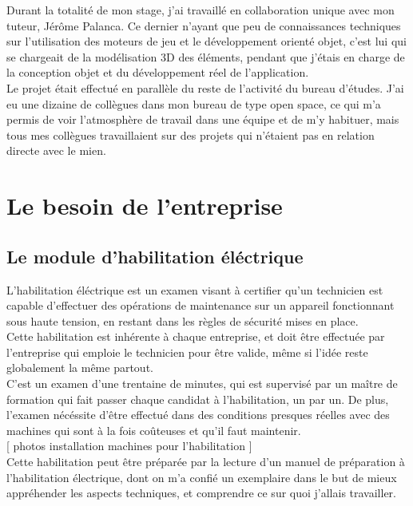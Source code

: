 \documentclass[a4paper]{article}
\begin{document}
    Durant la totalité de mon stage, j'ai travaillé en collaboration unique avec mon tuteur, Jérôme Palanca. Ce dernier n'ayant que peu de connaissances techniques sur l'utilisation des moteurs de jeu et le développement orienté objet, c'est lui qui se chargeait de la modélisation 3D des éléments, pendant que j'étais en charge de la conception objet et du développement réel de l'application. \\
    
    Le projet était effectué en parallèle du reste de l'activité du bureau d'études. J'ai eu une dizaine de collègues dans mon bureau de type open space, ce qui m'a permis de voir l'atmosphère de travail dans une équipe et de m'y habituer, mais tous mes collègues travaillaient sur des projets qui n'étaient pas en relation directe avec le mien. \\
    
    \section{Le besoin de l'entreprise}
    \subsection{Le module d'habilitation éléctrique}

        L'habilitation éléctrique est un examen visant à certifier qu'un technicien est capable d'effectuer des opérations de maintenance sur un appareil fonctionnant sous haute tension, en restant dans les règles de sécurité mises en place. \\

        Cette habilitation est inhérente à chaque entreprise, et doit être effectuée par l'entreprise qui emploie le technicien pour être valide, même si l'idée reste globalement la même partout. \\

        C'est un examen d'une trentaine de minutes, qui est supervisé par un maître de formation qui fait passer chaque candidat à l'habilitation, un par un. De plus, l'examen nécéssite d'être effectué dans des conditions presques réelles avec des machines qui sont à la fois coûteuses et qu'il faut maintenir. \\

        [ photos installation machines pour l'habilitation ] \\

        Cette habilitation peut être préparée par la lecture d'un manuel de préparation à l'habilitation électrique, dont on m'a confié un exemplaire dans le but de mieux appréhender les aspects techniques, et comprendre ce sur quoi j'allais travailler.
\end{document}
